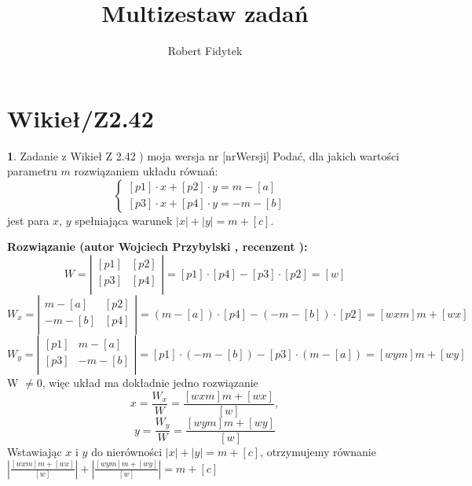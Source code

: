 \documentclass[12pt, a4paper]{article}
\title{Multizestaw zadań}
\author{Robert Fidytek}
\date{}
\theoremstyle{definition} %
\newtheorem{zad}{}
\newcommand{\kategoria}[1]{\section{#1}} %
\newcommand{\zadStart}[1]{\begin{zad}#1\newline} %
\newcommand{\zadStop}{\end{zad}}   %
\newcommand{\rozwStart}[2]{\noindent \textbf{Rozwiązanie (autor #1 , recenzent #2): }\newline} %
\begin{document}
\maketitle


\kategoria{Wikieł/Z2.42}
\zadStart{Zadanie z Wikieł Z 2.42 ) moja wersja nr [nrWersji]}
Podać, dla jakich wartości parametru $m$ rozwiązaniem układu równań:
$$
 \left\{ \begin{array}{ll}
[p1]\cdot x+[p2]\cdot y=m-[a] & \\
{[p3]}\cdot x+[p4]\cdot y=-m-[b]  & 
\end{array} \right.
$$
jest para $x$, $y$ spełniająca warunek $|x|+|y|=m+[c]$.
\zadStop
\rozwStart{Wojciech Przybylski}{}
$$
W =
\left| \begin{array}{ccc}
[p1] & [p2]  \\
{[p3]} & [p4]  \\
\end{array} \right| =[p1]\cdot[p4]-[p3]\cdot[p2]=[w]
$$
$$
W_{x} =
\left| \begin{array}{ccc}
m-[a] & [p2]  \\
-m-[b] & [p4]  \\
\end{array} \right| =(m-[a])\cdot[p4]-(-m-[b])\cdot[p2]=[wxm]m+[wx]
$$
$$
W_{y} =
\left| \begin{array}{ccc}
[p1] & m-[a] \\
{[p3]} & -m-[b]  \\
\end{array} \right| =[p1]\cdot(-m-[b])-[p3]\cdot(m-[a])=[wym]m+[wy]
$$
W $\neq 0$, więc układ ma dokładnie jedno rozwiązanie
$$x=\frac{W_{x}}{W}=\frac{[wxm]m+[wx]}{[w]},$$
$$y=\frac{W_{y}}{W}=\frac{[wym]m+[wy]}{[w]}$$
Wstawiając $x$ i $y$ do nierówności $|x|+|y|=m+[c]$, otrzymujemy równanie
$|\frac{[wxm]m+[wx]}{[w]}|+|\frac{[wym]m+[wy]}{[w]}|=m+[c]$
\end{document}
